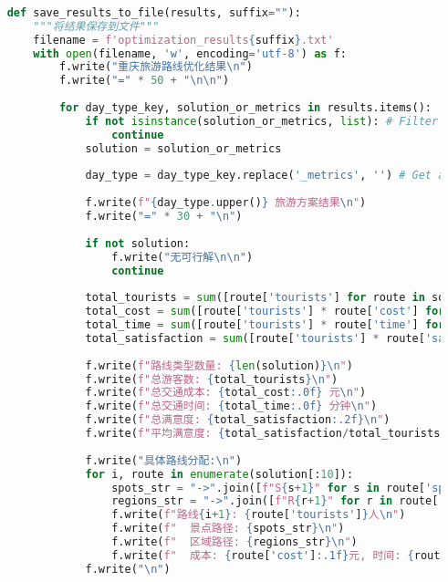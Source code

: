 \begin{lstlisting}[language=Python]
    
    def save_results_to_file(results, suffix=""):
        """将结果保存到文件"""
        filename = f'optimization_results{suffix}.txt'
        with open(filename, 'w', encoding='utf-8') as f:
            f.write("重庆旅游路线优化结果\n")
            f.write("=" * 50 + "\n\n")
            
            for day_type_key, solution_or_metrics in results.items():
                if not isinstance(solution_or_metrics, list): # Filter out metrics dictionary
                    continue
                solution = solution_or_metrics
    
                day_type = day_type_key.replace('_metrics', '') # Get actual day_type
                
                f.write(f"{day_type.upper()} 旅游方案结果\n")
                f.write("=" * 30 + "\n")
                
                if not solution:
                    f.write("无可行解\n\n")
                    continue
                
                total_tourists = sum([route['tourists'] for route in solution])
                total_cost = sum([route['tourists'] * route['cost'] for route in solution])
                total_time = sum([route['tourists'] * route['time'] for route in solution])
                total_satisfaction = sum([route['tourists'] * route['satisfaction'] for route in solution])
                
                f.write(f"路线类型数量: {len(solution)}\n")
                f.write(f"总游客数: {total_tourists}\n")
                f.write(f"总交通成本: {total_cost:.0f} 元\n")
                f.write(f"总交通时间: {total_time:.0f} 分钟\n")
                f.write(f"总满意度: {total_satisfaction:.2f}\n")
                f.write(f"平均满意度: {total_satisfaction/total_tourists:.2f}\n\n")
                
                f.write("具体路线分配:\n")
                for i, route in enumerate(solution[:10]):
                    spots_str = "->".join([f"S{s+1}" for s in route['spots']])
                    regions_str = "->".join([f"R{r+1}" for r in route['regions']])
                    f.write(f"路线{i+1}: {route['tourists']}人\n")
                    f.write(f"  景点路径: {spots_str}\n")
                    f.write(f"  区域路径: {regions_str}\n")
                    f.write(f"  成本: {route['cost']:.1f}元, 时间: {route['time']:.1f}分钟, 偏好: {route['preference']}\n\n")
                f.write("\n")
        

\end{lstlisting}
